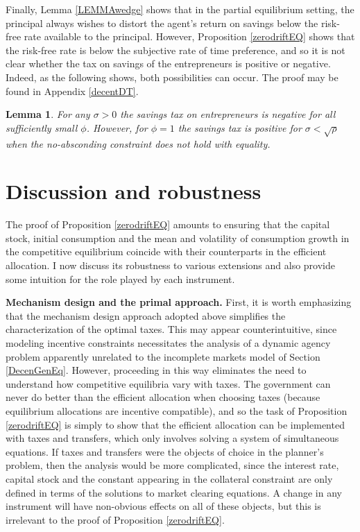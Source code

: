 \documentclass[11pt]{article}
\theoremstyle{plain}
\newtheorem{lemma}[thm]{Lemma}
\theoremstyle{definition} %
\begin{document}
Finally, Lemma \ref{LEMMAwedge} shows that in the partial equilibrium setting, the principal always wishes to distort the agent's return on savings below the risk-free rate available to the principal. However, Proposition \ref{zerodriftEQ} shows that the risk-free rate is below the subjective rate of time preference, and so it is not clear whether the tax on savings of the entrepreneurs is positive or negative. Indeed, as the following shows, both possibilities can occur. The proof may be found in Appendix \ref{decentDT}. 

\begin{lemma} \label{negS}
For any $\sigma>0$ the savings tax on entrepreneurs is negative for all sufficiently small $\phi$. However, for $\phi = 1$ the savings tax is positive for $\sigma < \sqrt{\rho}$ when the no-absconding constraint does not hold with equality.
\end{lemma}


\section{Discussion and robustness}\label{discuss}

The proof of Proposition \ref{zerodriftEQ} amounts to ensuring that the capital stock, initial consumption and the mean and volatility of consumption growth in the competitive equilibrium coincide with their counterparts in the efficient allocation. I now discuss its robustness to various extensions and also provide some intuition for the role played by each instrument.

\textbf{Mechanism design and the primal approach.} First, it is worth emphasizing that the mechanism design approach adopted above simplifies the characterization of the optimal taxes. This may appear counterintuitive, since modeling incentive constraints necessitates the analysis of a dynamic agency problem apparently unrelated to the incomplete markets model of Section \ref{DecenGenEq}. However, proceeding in this way eliminates the need to understand how competitive equilibria vary with taxes. The government can never do better than the efficient allocation when choosing taxes (because equilibrium allocations are incentive compatible), and so the task of Proposition \ref{zerodriftEQ} is simply to show that the efficient allocation can be implemented with taxes and transfers, which only involves solving a system of simultaneous equations. If taxes and transfers were the objects of choice in the planner's problem, then the analysis would be more complicated, since the interest rate, capital stock and the constant appearing in the collateral constraint are only defined in terms of the solutions to market clearing equations. A change in any instrument will have non-obvious effects on all of these objects, but this is irrelevant to the proof of Proposition \ref{zerodriftEQ}.
\end{document}
